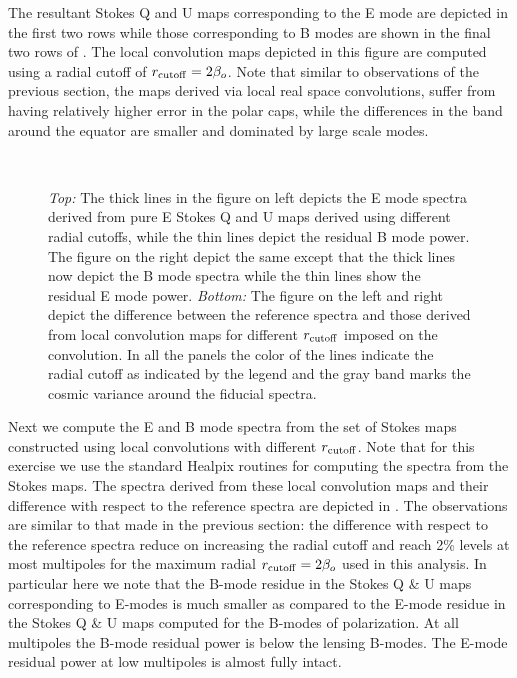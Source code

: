 %
The resultant Stokes Q and U maps corresponding to the E mode are depicted in the first two rows while those corresponding to B modes are shown in the final two rows of .  The local convolution maps depicted in this figure are computed using a radial cutoff of $r_{\rm cutoff }=2\beta_o$. Note that similar to observations of the previous section, the maps derived via local real space convolutions, suffer from having relatively higher error in the polar caps, while the differences in the  band around the equator are smaller and dominated by large scale modes.
%
\begin{figure}[!t] 
\centering
{}
\\[-5ex]
\caption{\textit{Top:} The thick lines in the figure on left depicts the E mode spectra derived from pure E Stokes Q and U maps derived using different radial cutoffs, while the thin lines depict the residual B mode power. The figure on the right depict the same except that the thick lines now depict the B mode spectra while the thin lines show the residual E mode power. \textit{Bottom:} The figure on the left and right depict the difference between the reference spectra and those derived from local convolution maps for different $r_{\rm cutoff}$ imposed on the convolution. In all the panels the color of the lines indicate the radial cutoff as indicated by the legend and the gray band marks the cosmic variance around the fiducial spectra.}
\label{fig:equ-bqu-spectra_rad_cutoff}
\end{figure}
%
Next we compute the E and B mode spectra from the set of Stokes maps constructed using local convolutions with different $r_{\rm cutoff}$. Note that for this exercise we use the standard Healpix routines for computing the spectra from the Stokes maps. The spectra derived from these local convolution maps and their difference with respect to the reference spectra are depicted in . The observations are similar to that made in the previous section: the difference with respect to the reference spectra reduce on increasing the radial cutoff and reach 2\% levels at most multipoles for the maximum radial $r_{\rm cutoff} =2 \beta_o$ used in this analysis.
In particular here we note that the B-mode residue in the Stokes Q \& U maps corresponding to E-modes is much smaller as compared to the E-mode residue in the Stokes Q \& U maps  computed for the B-modes of polarization. At all multipoles the B-mode residual power is below the lensing B-modes. The E-mode residual power at low multipoles is almost fully intact. 

